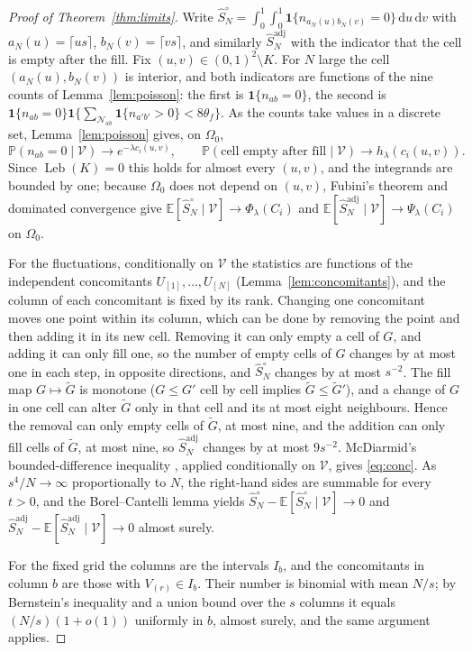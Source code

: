 \documentclass[11pt,a4paper]{article}
\theoremstyle{definition}
\theoremstyle{remark}
\newcommand{\E}{\mathbb{E}}
\newcommand{\Prob}{\mathbb{P}}
\newcommand{\Leb}{\operatorname{Leb}}
\newcommand{\ind}{\mathbf{1}}
\newcommand{\cV}{\mathcal{V}}
\newcommand{\cN}{\mathcal{N}}
\newcommand{\Sadj}{\hat S^{\mathrm{adj}}_N}
\newcommand{\Sun}{\hat S^{\circ}_N}
\begin{document}
\begin{proof}[Proof of Theorem~\ref{thm:limits}]
Write $\Sun=\int_0^1\!\int_0^1\ind\{n_{a_N(u)b_N(v)}=0\}\,\mathrm{d}u\,\mathrm{d}v$ with $a_N(u)=\lceil us\rceil$, $b_N(v)=\lceil vs\rceil$, and similarly $\Sadj$ with the indicator that the cell is empty after the fill. Fix $(u,v)\in(0,1)^2\setminus K$. For $N$ large the cell $(a_N(u),b_N(v))$ is interior, and both indicators are functions of the nine counts of Lemma~\ref{lem:poisson}: the first is $\ind\{n_{ab}=0\}$, the second is $\ind\{n_{ab}=0\}\ind\{\sum_{\cN_{ab}}\ind\{n_{a'b'}>0\}<8\theta_f\}$. As the counts take values in a discrete set, Lemma~\ref{lem:poisson} gives, on $\Omega_0$,
\[
\Prob(n_{ab}=0\mid\cV)\to e^{-\lambda c_i(u,v)},\qquad \Prob(\text{cell empty after fill}\mid\cV)\to h_\lambda(c_i(u,v)).
\]
Since $\Leb(K)=0$ this holds for almost every $(u,v)$, and the integrands are bounded by one; because $\Omega_0$ does not depend on $(u,v)$, Fubini's theorem and dominated convergence give $\E[\Sun\mid\cV]\to\Phi_\lambda(C_i)$ and $\E[\Sadj\mid\cV]\to\Psi_\lambda(C_i)$ on $\Omega_0$.

For the fluctuations, conditionally on $\cV$ the statistics are functions of the independent concomitants $U_{[1]},\dots,U_{[N]}$ (Lemma~\ref{lem:concomitants}), and the column of each concomitant is fixed by its rank. Changing one concomitant moves one point within its column, which can be done by removing the point and then adding it in its new cell. Removing it can only empty a cell of $G$, and adding it can only fill one, so the number of empty cells of $G$ changes by at most one in each step, in opposite directions, and $\Sun$ changes by at most $s^{-2}$. The fill map $G\mapsto\tilde G$ is monotone ($G\le G'$ cell by cell implies $\tilde G\le\tilde G'$), and a change of $G$ in one cell can alter $\tilde G$ only in that cell and its at most eight neighbours. Hence the removal can only empty cells of $\tilde G$, at most nine, and the addition can only fill cells of $\tilde G$, at most nine, so $\Sadj$ changes by at most $9s^{-2}$. McDiarmid's bounded-difference inequality \citep{mcdiarmid1989}, applied conditionally on $\cV$, gives \eqref{eq:conc}. As $s^4/N\to\infty$ proportionally to $N$, the right-hand sides are summable for every $t>0$, and the Borel--Cantelli lemma yields $\Sun-\E[\Sun\mid\cV]\to0$ and $\Sadj-\E[\Sadj\mid\cV]\to0$ almost surely.

For the fixed grid the columns are the intervals $I_b$, and the concomitants in column $b$ are those with $V_{(r)}\in I_b$. Their number is binomial with mean $N/s$; by Bernstein's inequality and a union bound over the $s$ columns it equals $(N/s)(1+o(1))$ uniformly in $b$, almost surely, and the same argument applies.
\end{proof}
\end{document}
